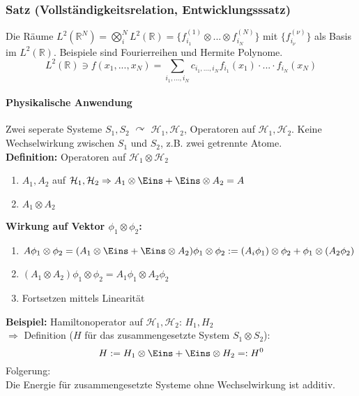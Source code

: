 \documentclass[twoside,a4paper]{scrartcl}
\renewcommand{\1}{\mathds{1}}
\begin{document}
\subsubsection*{Satz (Vollständigkeitsrelation, Entwicklungsssatz)}
Die Räume $L^2(\mathbb R^N)=\bigotimes_i^N L^2(\mathbb R)=\{ f_{i_1}^{(1)} \otimes ... \otimes f_{i_N}^{(N)}\}$ mit $\{f_{i_\nu}^{(\nu)}\}$ als Basis im $L^2(\mathbb R)$.
Beispiele sind Fourierreihen und Hermite Polynome.
$$L^2(\mathbb R) \ni f(x_1,...,x_N)=\sum_{i_1,...,i_N} c_{i_1,...,i_N}f_{i_1}(x_1)\cdot ... \cdot f_{i_N}(x_N)$$
\paragraph{Physikalische Anwendung}
Zwei seperate Systeme $S_1,S_2$ $\curvearrowright$ $\mathcal H_1,\mathcal H_2$, Operatoren auf $\mathcal H_1, \mathcal H_2$. Keine Wechselwirkung zwischen $S_1$ und $S_2$, z.B. zwei getrennte Atome.\\
\textbf{Definition:} Operatoren auf $\mathcal H_1 \otimes \mathcal H_2$
\begin{enumerate}
 \item $A_1,A_2$ auf $\mathcal H_1, \mathcal H_2 \Rightarrow A_1 \otimes \Eins+\Eins \otimes A_2=A$ 
 \item $A_1 \otimes A_2$
\end{enumerate}
\textbf{Wirkung auf Vektor $\phi_1 \otimes \phi_2$:}\\
\begin{enumerate}
 \item $A\phi_1 \otimes \phi_2=(A_1 \otimes \Eins+\Eins \otimes A_2)\phi_1 \otimes \phi_2:= (A_i \phi_1)\otimes \phi_2 +\phi_1 \otimes (A_2 \phi_2)$ 
 \item $(A_1 \otimes A_2)\phi_1 \otimes \phi_2=A_1\phi_1 \otimes A_2\phi_2$
 \item Fortsetzen mittels Linearität
\end{enumerate}
\textbf{Beispiel:}
Hamiltonoperator auf $\mathcal H_1, \mathcal H_2$: $H_1,H_2$\\
$\Rightarrow$ Definition ($H$ für das zusammengesetzte System $S_1 \otimes S_2$): \\
$$H:=H_1 \otimes \Eins + \Eins \otimes H_2=:H^0$$
Folgerung:\\
Die Energie für zusammengesetzte Systeme ohne Wechselwirkung ist additiv.
\end{document}
